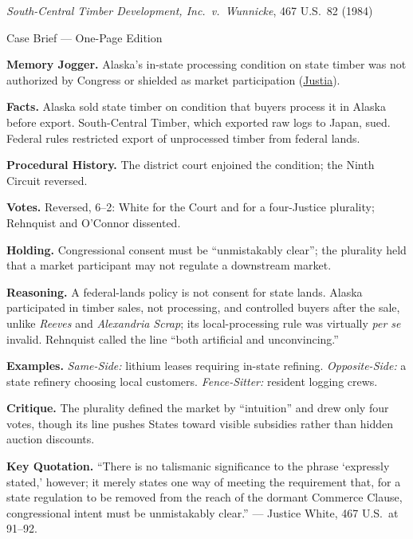 \documentclass[12pt]{article}
\begin{document}
\begin{center}
{\Large \textit{South-Central Timber Development, Inc.\ v.\ Wunnicke}, 467 U.S.\ 82 (1984)\par}
\vspace{0.3em}
{\normalsize Case Brief --- One-Page Edition\par}
\end{center}

\textbf{Memory Jogger.} Alaska's in-state processing condition on state timber was not authorized by Congress or shielded as market participation (\href{https://supreme.justia.com/cases/federal/us/467/82/}{Justia}).

\textbf{Facts.} Alaska sold state timber on condition that buyers process it in Alaska before export. South-Central Timber, which exported raw logs to Japan, sued. Federal rules restricted export of unprocessed timber from federal lands.

\textbf{Procedural History.} The district court enjoined the condition; the Ninth Circuit reversed.

\textbf{Votes.} Reversed, 6--2: White for the Court and for a four-Justice plurality; Rehnquist and O'Connor dissented.

\textbf{Holding.} Congressional consent must be ``unmistakably clear''; the plurality held that a market participant may not regulate a downstream market.

\textbf{Reasoning.} A federal-lands policy is not consent for state lands. Alaska participated in timber sales, not processing, and controlled buyers after the sale, unlike \textit{Reeves} and \textit{Alexandria Scrap}; its local-processing rule was virtually \textit{per se} invalid. Rehnquist called the line ``both artificial and unconvincing.''

\textbf{Examples.} \emph{Same-Side:} lithium leases requiring in-state refining. \emph{Opposite-Side:} a state refinery choosing local customers. \emph{Fence-Sitter:} resident logging crews.

\textbf{Critique.} The plurality defined the market by ``intuition'' and drew only four votes, though its line pushes States toward visible subsidies rather than hidden auction discounts.

\textbf{Key Quotation.} ``There is no talismanic significance to the phrase `expressly stated,' however; it merely states one way of meeting the requirement that, for a state regulation to be removed from the reach of the dormant Commerce Clause, congressional intent must be unmistakably clear.'' --- Justice White, 467 U.S.\ at 91--92.
\end{document}
